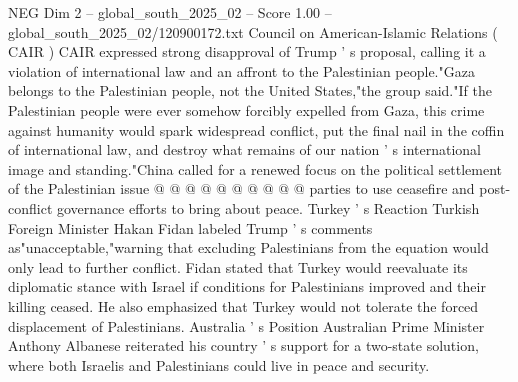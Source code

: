 \begin{textsample}{NEG Dim 2 – global\_south\_2025\_02 – Score 1.00 – global\_south\_2025\_02/120900172.txt}
Council on American-Islamic Relations ( CAIR ) CAIR expressed strong disapproval of Trump ' s proposal, calling it a violation of international law and an affront to the Palestinian people."Gaza belongs to the Palestinian people, not the United States,"the group said."If the Palestinian people were ever somehow forcibly expelled from Gaza, this crime against humanity would spark widespread conflict, put the final nail in the coffin of international law, and destroy what remains of our nation ' s international image and standing."China called for a renewed focus on the political settlement of the Palestinian issue @ @ @ @ @ @ @ @ @ @ parties to use ceasefire and post-conflict governance efforts to bring about peace.
Turkey ' s Reaction Turkish Foreign Minister Hakan Fidan labeled Trump ' s comments as"unacceptable,"warning that excluding Palestinians from the equation would only lead to further conflict.
Fidan stated that Turkey would reevaluate its diplomatic stance with Israel if conditions for Palestinians improved and their killing ceased.
He also emphasized that Turkey would not tolerate the forced displacement of Palestinians.
Australia ' s Position Australian Prime Minister Anthony Albanese reiterated his country ' s support for a two-state solution, where both Israelis and Palestinians could live in peace and security.

\end{textsample}
